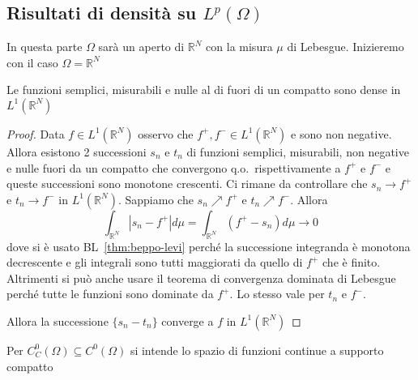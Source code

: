\subsection{Risultati di densità su \(L^{p}{(\Omega)}\) }
In questa parte \(\Omega\) sarà un aperto di \(\mathbb{R}^{N}\) con la misura
\(\mu\) di Lebesgue. Inizieremo con il caso \(\Omega = \mathbb{R}^{N}\) 
\begin{proposition}\label{prop:risultato_1}
    Le funzioni semplici, misurabili e nulle al di fuori di un compatto sono
    dense in \(L^1(\mathbb{R}^{N})\) 
\end{proposition}
\begin{proof}
    Data \(f \in L^1(\mathbb{R}^{N})\) osservo che \(f^{+}, f^{-} \in
    L^1(\mathbb{R}^{N})\) e sono non negative. Allora esistono 2 successioni
    \(s_{n}\) e \(t_{n}\) di funzioni semplici, misurabili, non negative e nulle fuori da un
    compatto che convergono q.o.~rispettivamente a \(f^{+}\) e \(f^{-}\) e
    queste successioni sono monotone crescenti. Ci rimane da controllare che
    \(s_{n} \to f^{+}\) e \(t_{n} \to f^{-}\) in \(L^{1}{(\mathbb{R}^{N})}\).
    Sappiamo che \(s_{n} \nearrow f^{+}\) e \(t_{n} \nearrow f^{-}\). Allora
    \[
        \int_{\mathbb{R}^{N}} |s_{n} - f^{+}| d\mu = \int_{\mathbb{R}^{N}}
        \left(f^{+}
        - s_{n}\right) d\mu \to 0
    \]
    dove si è usato BL~\ref{thm:beppo-levi} perché la successione integranda è
    monotona decrescente e gli integrali sono tutti maggiorati da quello di
    \(f^{+}\) che è finito. Altrimenti si può anche usare il teorema di
    convergenza dominata di Lebesgue perché tutte le funzioni sono dominate da
    \(f^{+}\). Lo stesso vale per \(t_{n}\) e \(f^{-}\). 

    Allora la successione \(\{s_{n} - t_{n}\}\) converge a \(f\) in
    \(L^1(\mathbb{R}^{N})\) 
\end{proof}

Per \(C_C^{0}{(\Omega)} \subseteq C^{0}{(\Omega)} \) si intende lo spazio di funzioni continue a supporto
compatto

